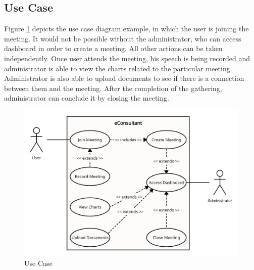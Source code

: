 \documentclass{article}
\begin{document}
\subsection{Use Case}

{\large 
Figure \ref{fig:Use Case} depicts the use case diagram example, in which the user is joining the meeting. It would not be possible without the administrator, who can access dashboard in order to create a meeting. All other actions can be taken independently. Once user attends the meeting, his speech is being recorded and administrator is able to view the charts related to the particular meeting. Administrator is also able to upload documents to see if there is a connection between them and the meeting. After the completion of the gathering, administrator can conclude it by closing the meeting.\par
}
\vspace{10pt}
\begin{figure}[H]
  \centering
  \includegraphics[scale=0.3]{img/usecase.png}
  \caption{Use Case}
  \label{fig:Use Case}
\end{figure}
\end{document}
